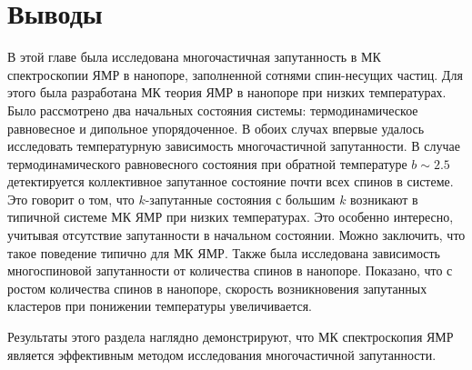 \section{Выводы}
\label{sec:conslusions}

В этой главе была исследована многочастичная запутанность в МК спектроскопии ЯМР в нанопоре, заполненной сотнями спин-несущих частиц.
Для этого была разработана МК теория ЯМР в нанопоре при низких температурах.
Было рассмотрено два начальных состояния системы:
термодинамическое равновесное
и дипольное упорядоченное.
В обоих случах впервые удалось исследовать температурную зависимость многочастичной запутанности.
В случае термодинамического равновесного состояния при обратной температуре $b \sim 2.5$ детектируется коллективное запутанное состояние почти всех спинов в системе.
Это говорит о том, что $k$-запутанные состояния с большим $k$ возникают в типичной системе МК ЯМР при низких температурах.
Это особенно интересно, учитывая отсутствие запутанности в начальном состоянии.
Можно заключить, что такое поведение типично для МК ЯМР.
Также была исследована зависимость многоспиновой запутанности
от количества спинов в нанопоре.
Показано, что с ростом количества спинов в нанопоре,
скорость возникновения запутанных кластеров при понижении температуры увеличивается.

Результаты этого раздела наглядно демонстрируют,
что МК спектроскопия ЯМР является эффективным методом исследования многочастичной запутанности.
